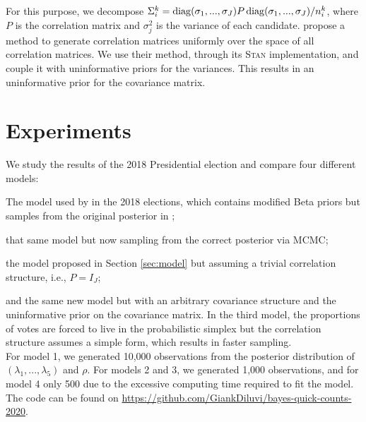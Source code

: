 \documentclass{article}
\begin{document}
For this purpose, we decompose $\Sigma_i^k = \operatorname{diag}(\sigma_1, ..., \sigma_J) P \operatorname{diag}(\sigma_1, ..., \sigma_J) / n_i^k$, where $P$ is the correlation matrix and $\sigma_j^2$ is the variance of each candidate. \citet{lewandowski2009} propose a method to generate correlation matrices uniformly over the space of all correlation matrices. We use their method, through its \textsc{Stan} implementation, and couple it with uninformative priors for the variances. This results in an uninformative prior for the covariance matrix.
\\




\section{Experiments} \label{sec:experiments}


We study the results of the 2018 Presidential election and compare four different models:
\benum
  \item The model used by \citet{diluvi2018} in the 2018 elections, which contains modified Beta priors but samples from the original posterior in \citet{mendoza-nieto2016};
  \item that same model but now sampling from the correct posterior via MCMC;
  \item the model proposed in Section \ref{sec:model} but assuming a trivial correlation structure, i.e., $P = I_J$;
  \item and the same new model but with an arbitrary covariance structure and the uninformative prior on the covariance matrix.
\eenum
In the third model, the proportions of votes are forced to live in the probabilistic simplex but the correlation structure assumes a simple form, which results in faster sampling. \\

For model 1, we generated 10,000 observations from the posterior distribution of $(\lambda_1, ..., \lambda_5)$ and $\rho$. For models 2 and 3, we generated 1,000 observations, and for model 4 only 500 due to the excessive computing time required to fit the model. The code can be found on \href{https://github.com/GiankDiluvi/bayes-quick-counts-2020}{\url{https://github.com/GiankDiluvi/bayes-quick-counts-2020}}. \\
\end{document}
